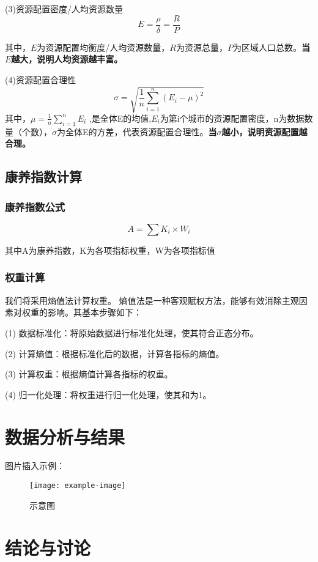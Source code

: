 \documentclass[12pt,a4paper]{article}
\begin{document}
(3)资源配置密度/人均资源数量
\[
E = \frac{\rho}{\delta}=\frac{R}{P}
\]

其中，$E$为资源配置均衡度/人均资源数量，$R$为资源总量，$P$为区域人口总数。\textbf{当$E$越大，说明人均资源越丰富。}

(4)资源配置合理性
\[
\sigma = \sqrt{\frac{1}{n} \sum_{i=1}^{n}(E_i - \mu)^2}
\]
其中，$\mu = \frac{1}{n} \sum_{i=1}^{n}E_i$ \text{ },是全体E的均值,$E_i$为第i个城市的资源配置密度，n为数据数量（个数），$\sigma$为全体E的方差，代表资源配置合理性。\textbf{当$\sigma$越小，说明资源配置越合理。}

\subsection{康养指数计算}

\subsubsection{康养指数公式}

\[A = \sum K_i \times W_i\]

其中A为康养指数，K为各项指标权重，W为各项指标值

\subsubsection{权重计算}

我们将采用熵值法\cite{02}计算权重。
熵值法是一种客观赋权方法，能够有效消除主观因素对权重的影响。其基本步骤如下：

(1) 数据标准化：将原始数据进行标准化处理，使其符合正态分布。

(2) 计算熵值：根据标准化后的数据，计算各指标的熵值。

(3) 计算权重：根据熵值计算各指标的权重。

(4) 归一化处理：将权重进行归一化处理，使其和为1。

\section{数据分析与结果}
图片插入示例：
\begin{figure}[h]
    \centering
    \texttt{[image: example-image]} %
    \caption{示意图}
\end{figure}

\section{结论与讨论}
\end{document}
